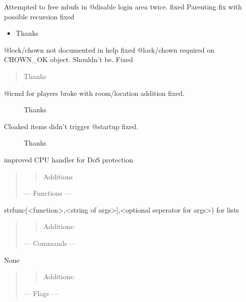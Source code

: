 \documentclass[letterpaper,10pt,english]{sphinxmanual}
\begin{document}
\sphinxAtStartPar
Attempted to free mbufs in @disable login area twice.  \sphinxhyphen{} fixed
Parenting fix with possible recursion \sphinxhyphen{} fixed
\begin{itemize}
\item {} 
\sphinxAtStartPar
Thanks 

\end{itemize}

\sphinxAtStartPar
@lock/chown not documented in help \sphinxhyphen{} fixed
@lock/chown required on CHOWN\_OK object.  Shouldn’t be.  \sphinxhyphen{} Fixed
\begin{quote}

\sphinxAtStartPar
\sphinxhyphen{}Thanks 
\end{quote}
\begin{description}
\item[{@icmd for players broke with room/location addition \sphinxhyphen{} fixed.}] \leavevmode
\sphinxAtStartPar
\sphinxhyphen{}Thanks 

\item[{Cloaked items didn’t trigger @startup \sphinxhyphen{} fixed.}] \leavevmode
\sphinxAtStartPar
\sphinxhyphen{}Thanks 

\end{description}

\sphinxAtStartPar
improved CPU handler for DoS protection
\begin{quote}
\begin{quote}

\sphinxAtStartPar
Additions
\end{quote}

\sphinxAtStartPar
— Functions —
\end{quote}

\sphinxAtStartPar
strfunc(\textless{}function\textgreater{},\textless{}string of args\textgreater{}{[},\textless{}optional seperator for args\textgreater{}) \sphinxhyphen{} for lists
\begin{quote}
\begin{quote}

\sphinxAtStartPar
Additions:
\end{quote}

\sphinxAtStartPar
— Commands —
\end{quote}

\sphinxAtStartPar
None
\begin{quote}
\begin{quote}

\sphinxAtStartPar
Additions:
\end{quote}

\sphinxAtStartPar
— Flags —
\end{quote}
\end{document}
